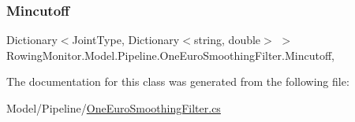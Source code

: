 \subsubsection{\texorpdfstring{Mincutoff}{Mincutoff}}
{\footnotesize\ttfamily Dictionary$<$Joint\+Type, Dictionary$<$string, double$>$ $>$ Rowing\+Monitor.\+Model.\+Pipeline.\+One\+Euro\+Smoothing\+Filter.\+Mincutoff\hspace{0.3cm}{\ttfamily [get]}, {\ttfamily [set]}}



The documentation for this class was generated from the following file\+:\begin{DoxyCompactItemize}
\item 
Model/\+Pipeline/\hyperlink{_one_euro_smoothing_filter_8cs}{One\+Euro\+Smoothing\+Filter.\+cs}\end{DoxyCompactItemize}
